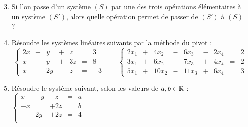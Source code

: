 \begin{frame}
\begin{miniexercice}
\begin{enumerate}\setcounter{enumi}{2} 
  \item Si l'on passe d'un système $(S)$ par une des trois opérations élémentaires à un système
  $(S')$, alors quelle opération permet de passer de $(S')$ à $(S)$ ?
    
  \item Résoudre les systèmes linéaires suivants par la méthode du pivot :
  $$\left\{
\begin{array}{ccccccc}
2x   &+&  y    &+&   z  &=&  3 \\
x    &-&  y    &+&   3z &=&  8 \\
x    &+&  2y   &-&   z  &=&  -3
\end{array}\right. \qquad
\left\{
\begin{array}{ccccccccc} 
2x_1 & + & 4x_2 & - & 6x_3 & - & 2x_4 & = & 2\\
3x_1 & + & 6x_2 & - & 7x_3 & + & 4x_4 &= & 2\\
5x_1 & + & 10 x_2 & - & 11 x_3 & + & 6x_4 &   = & 3
\end{array}
 \right.
$$

\vspace*{-2ex}
  
  \item Résoudre le système suivant, selon les valeurs de $a,b \in \mathbb{R}$ :
$\left \{ \begin{array}{ccccc}
x  & +y &-z   &=& a \\
-x &    & +2z &=& b \\
   & 2y & +2z &=& 4 \\
\end{array} \right.$
\end{enumerate}
\end{miniexercice}
\end{frame}


